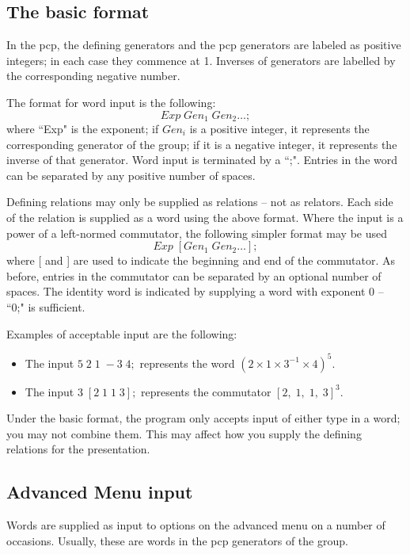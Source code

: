 \subsection{The basic format}
In the pcp, the defining generators and the pcp generators are 
labeled as positive integers; in each case they commence at 1.
Inverses of generators are labelled by the corresponding negative number.

The format for word input is the following:
\begin{displaymath}
Exp\; Gen_1\; Gen_2 \ldots ;
\end{displaymath}
where ``Exp" is the exponent;
if $Gen_i$ is a positive integer, it represents the corresponding
generator of the group; if it is a negative integer, it represents
the inverse of that generator.  Word input is terminated by a ``;". 
Entries in the word can be separated by any positive 
number of spaces.

Defining relations may only be supplied as relations -- not as relators.
Each side of the relation is supplied as a word using the above
format. Where the input is a power of a left-normed commutator, the 
following simpler format may be used
\begin{displaymath}
Exp\; [ Gen_1\; Gen_2 \ldots ];
\end{displaymath}
where [ and ] are used to indicate the beginning and end of the commutator.
As before, entries in the commutator can be separated by an optional number 
of spaces.  The identity word is indicated by supplying a word with 
exponent 0 -- ``0;" is sufficient.

Examples of acceptable input are the following:
\begin{itemize}
\item The input $5\; 2\; 1\; -\!\!3\; 4;$
represents the word $(2 \times 1 \times 3^{-1} \times 4)^5$.
\item The input $3\; [2\; 1\; 1\; 3];$ represents
the commutator  $[2,\; 1,\; 1,\; 3]^3$.
\end{itemize}
Under the basic format, the program only accepts input of 
either type in a word; you may not combine them. This may affect 
how you supply the defining relations for the presentation.

\subsection{Advanced Menu input}
Words are supplied as input to options on the advanced menu 
on a number of occasions. Usually, these are words in the 
pcp generators of the group.

